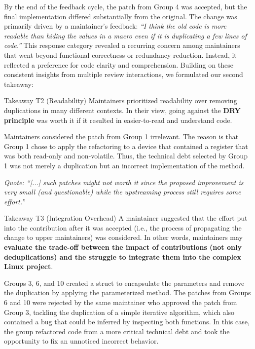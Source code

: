 \documentclass[10pt,conference]{IEEEtran}
\newenvironment{highlight-box}[1]{%
  \begin{tcolorbox}
  \textbf{#1:} \itshape}{\end{tcolorbox}}
\begin{document}
By the end of the feedback cycle, the patch from Group 4 was accepted, but the final implementation differed substantially from the original. The change was primarily driven by a maintainer's feedback: \textit{``I think the old code is more readable than hiding the values in a macro even if it is duplicating a few lines of code.''}
%
This response category revealed a recurring concern among maintainers that went beyond functional correctness or redundancy reduction. Instead, it reflected a preference for code clarity and comprehension. Building on these consistent insights from multiple review interactions, we formulated our second takeaway:

\begin{highlight-box}{Takeaway T2 (Readability)}
Maintainers prioritized readability over removing duplications in many different contexts. In their view, going against the \textbf{DRY principle} was worth it if it resulted in easier-to-read and understand code.
\end{highlight-box}

Maintainers considered the patch from Group 1 irrelevant.
The reason is that Group 1 chose to apply the refactoring to a device that contained a register that was both read-only and non-volatile. Thus, the technical debt selected by Group 1 was not merely a duplication but an incorrect implementation of the method.

\noindent
\begin{footnotesize}
\textit{
  Quote: ``[...] such patches might not worth it since the proposed
  improvement is very small (and questionable) while the upstreaming process
  still requires some effort.''
}
\end{footnotesize}

\begin{highlight-box}{Takeaway T3 (Integration Overhead)}
  A maintainer suggested that the effort put into the contribution after it was
  accepted (i.e., the process of propagating the change to upper maintainers)
  was considered. In other words, maintainers may \textbf{evaluate the
  trade-off between the impact of contributions (not only deduplications) and
  the struggle to integrate them into the complex Linux project}.
\end{highlight-box}


Groups 3, 6, and 10 created a struct to encapsulate the parameters and remove the duplication by applying the parameterized method. The patches from Groups 6 and 10 were rejected by the same maintainer who approved the patch from Group 3, tackling the duplication of a simple iterative algorithm, which also contained a bug that could be inferred by inspecting both functions. In this case, the group refactored code from a more critical technical debt and took the opportunity to fix an unnoticed incorrect behavior.
\end{document}
